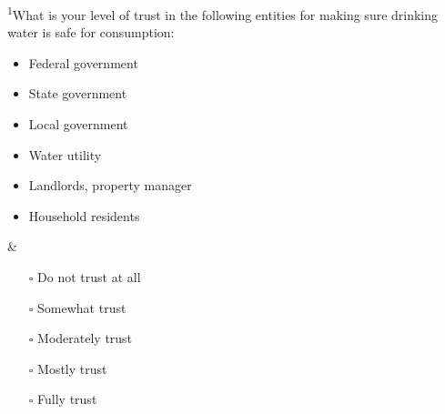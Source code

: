 \documentclass[
]{article}
\begin{document}
\begin{longtblr}[         %
caption={},
entry=none,label=none,
note{1}={Matrix style question.},
label=tblr:quest,
caption={Survey questions.},
]
\textsuperscript{1}What is your level of trust in the following entities for making sure drinking water is safe for consumption:    \begin{itemize}[nosep]    \item Federal government    \item State government    \item Local government    \item Water utility    \item Landlords, property manager    \item Household residents    \end{itemize}                                                                                                & \begin{itemize}[nosep]    \item[$\square$] Do not trust at all    \item[$\square$] Somewhat trust    \item[$\square$] Moderately trust    \item[$\square$] Mostly trust    \item[$\square$] Fully trust    \end{itemize}                                                                                                                                                                                                                                                                                                                                                               \\

\end{longtblr}
\end{document}
